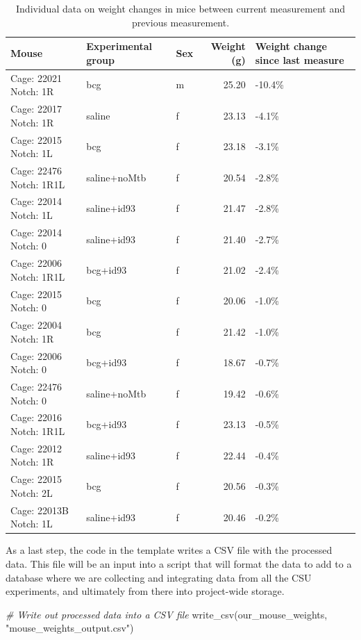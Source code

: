 \documentclass[
]{book}
\newenvironment{Shaded}{\begin{snugshade}}{\end{snugshade}}
\newcommand{\CommentTok}[1]{\textcolor[rgb]{0.56,0.35,0.01}{\textit{#1}}}
\newcommand{\FunctionTok}[1]{\textcolor[rgb]{0.00,0.00,0.00}{#1}}
\newcommand{\NormalTok}[1]{#1}
\newcommand{\StringTok}[1]{\textcolor[rgb]{0.31,0.60,0.02}{#1}}
\begin{document}
\begin{table}

\caption{\label{tab:unnamed-chunk-18}Individual data on weight changes in mice between current measurement and previous measurement.}
\centering
\begin{tabular}[t]{l|l|l|r|l}
\hline
Mouse & Experimental group & Sex & Weight (g) & Weight change since last measure\\
\hline
Cage: 22021 Notch: 1R & bcg & m & 25.20 & -10.4\%\\
\hline
Cage: 22017 Notch: 1R & saline & f & 23.13 & -4.1\%\\
\hline
Cage: 22015 Notch: 1L & bcg & f & 23.18 & -3.1\%\\
\hline
Cage: 22476 Notch: 1R1L & saline+noMtb & f & 20.54 & -2.8\%\\
\hline
Cage: 22014 Notch: 1L & saline+id93 & f & 21.47 & -2.8\%\\
\hline
Cage: 22014 Notch: 0 & saline+id93 & f & 21.40 & -2.7\%\\
\hline
Cage: 22006 Notch: 1R1L & bcg+id93 & f & 21.02 & -2.4\%\\
\hline
Cage: 22015 Notch: 0 & bcg & f & 20.06 & -1.0\%\\
\hline
Cage: 22004 Notch: 1R & bcg & f & 21.42 & -1.0\%\\
\hline
Cage: 22006 Notch: 0 & bcg+id93 & f & 18.67 & -0.7\%\\
\hline
Cage: 22476 Notch: 0 & saline+noMtb & f & 19.42 & -0.6\%\\
\hline
Cage: 22016 Notch: 1R1L & bcg+id93 & f & 23.13 & -0.5\%\\
\hline
Cage: 22012 Notch: 1R & saline+id93 & f & 22.44 & -0.4\%\\
\hline
Cage: 22015 Notch: 2L & bcg & f & 20.56 & -0.3\%\\
\hline
Cage: 22013B Notch: 1L & saline+id93 & f & 20.46 & -0.2\%\\
\hline
\end{tabular}
\end{table}

As a last step, the code in the template writes a CSV file with the processed
data. This file will be an input into a script that will format the data to
add to a database where we are collecting and integrating data from all the CSU
experiments, and ultimately from there into project-wide storage.

\begin{Shaded}
\begin{Highlighting}[]
\CommentTok{\# Write out processed data into a CSV file}
\FunctionTok{write\_csv}\NormalTok{(our\_mouse\_weights, }\StringTok{"mouse\_weights\_output.csv"}\NormalTok{)}
\end{Highlighting}
\end{Shaded}
\end{document}
